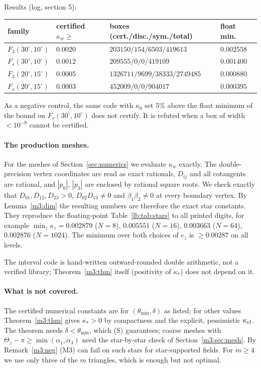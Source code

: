 Results (log, section 5):
\begin{center}
\small
\begin{tabular}{llll}
\toprule
family & certified $\kappa_w\ge$ & boxes (cert./disc./sym./total) & float min.\\
\midrule
$F_3(30^\circ,10^\circ)$ & $0.0020$ & $203150/154/6503/419613$ & $0.002558$\\
$F_s(30^\circ,10^\circ)$ & $0.0012$ & $209555/0/0/419109$ & $0.001400$\\
$F_3(20^\circ,15^\circ)$ & $0.0005$ & $1326711/9699/38333/2749485$ & $0.000880$\\
$F_s(20^\circ,15^\circ)$ & $0.0003$ & $452009/0/0/904017$ & $0.000395$\\
\bottomrule
\end{tabular}
\end{center}
As a negative control, the same code with $\kappa_0$ set $5\%$ above the float minimum of the bound on $F_s(30^\circ,10^\circ)$ does not certify. It is refuted when a box of width $<10^{-9}$ cannot be certified.

\paragraph{The production meshes.}\label{m3:sec:mesh}
For the meshes of Section~\ref{sec:numerics} we evaluate $\kappa_w$ exactly. The double-precision vertex coordinates are read as exact rationals, $D_{ij}$ and all cotangents are rational, and $|p_0|$, $|p_3|$ are enclosed by rational square roots. We check exactly that $D_{01},D_{12},D_{23}>0$, $D_{02}D_{13}\ne0$ and $\beta_1\beta_2\ne0$ at every boundary vertex. By Lemma~\ref{m3:dim} the resulting numbers are therefore the exact star constants. They reproduce the floating-point Table~\ref{lb:tab:stars} to all printed digits, for example $\min_z\kappa_z=0.002879$ ($N=8$), $0.005551$ ($N=16$), $0.003663$ ($N=64$), $0.002876$ ($N=1024$). The minimum over both choices of $e_z$ is $\ge0.00287$ on all levels.

The interval code is hand-written outward-rounded double arithmetic, not a verified library; Theorem~\ref{m3:thm} itself (positivity of $\kappa_\ast$) does not depend on it.

\paragraph{What is not covered.} The certified numerical constants are for $(\theta_{\min},\delta)$ as listed; for other values Theorem~\ref{m3:thm} gives $\kappa_\ast>0$ by compactness and the explicit, pessimistic $\kappa_{\rm el}$. The theorem needs $\delta<\theta_{\min}$, which (S) guarantees; coarse meshes with $\Theta_z-\pi\ge\min(\alpha_1,\alpha_3)$ need the star-by-star check of Section~\ref{m3:sec:mesh}. By Remark~\ref{m3:neg} (M3) can fail on such stars for star-supported fields. For $m\ge4$ we use only three of the $m$ triangles, which is enough but not optimal.
